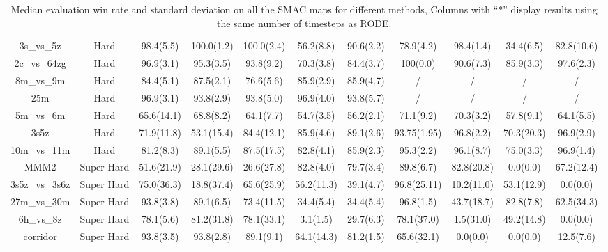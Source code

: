 \begin{table}
\begin{tabular}{ccccccccccc}
        3s\_vs\_5z &           Hard &   98.4(5.5) &  100.0(1.2) & 100.0(2.4) &  56.2(8.8) &  90.6(2.2) &   78.9(4.2) &  98.4(1.4) &  34.4(6.5) & 82.8(10.6) \\
      2c\_vs\_64zg &           Hard &   96.9(3.1) &   95.3(3.5) &  93.8(9.2) &  70.3(3.8) &  84.4(3.7) &    100(0.0) &  90.6(7.3) &  85.9(3.3) &  97.6(2.3) \\
        8m\_vs\_9m &           Hard &   84.4(5.1) &   87.5(2.1) &  76.6(5.6) &  85.9(2.9) &  85.9(4.7) &           / &          / &          / &          / \\
             25m &           Hard &   96.9(3.1) &   93.8(2.9) &  93.8(5.0) &  96.9(4.0) &  93.8(5.7) &           / &          / &          / &          / \\
        5m\_vs\_6m &           Hard &  65.6(14.1) &   68.8(8.2) &  64.1(7.7) &  54.7(3.5) &  56.2(2.1) &   71.1(9.2) &  70.3(3.2) &  57.8(9.1) &  64.1(5.5) \\
            3s5z &           Hard &  71.9(11.8) &  53.1(15.4) & 84.4(12.1) &  85.9(4.6) &  89.1(2.6) & 93.75(1.95) &  96.8(2.2) & 70.3(20.3) &  96.9(2.9) \\
      10m\_vs\_11m &           Hard &   81.2(8.3) &   89.1(5.5) & 87.5(17.5) &  82.8(4.1) &  85.9(2.3) &   95.3(2.2) &  96.1(8.7) &  75.0(3.3) &  96.9(1.4) \\
            MMM2 &     Super Hard &  51.6(21.9) &  28.1(29.6) & 26.6(27.8) &  82.8(4.0) &  79.7(3.4) &   89.8(6.7) & 82.8(20.8) &   0.0(0.0) & 67.2(12.4) \\
    3s5z\_vs\_3s6z &     Super Hard &  75.0(36.3) &  18.8(37.4) & 65.6(25.9) & 56.2(11.3) &  39.1(4.7) & 96.8(25.11) & 10.2(11.0) & 53.1(12.9) &   0.0(0.0) \\
      27m\_vs\_30m &     Super Hard &   93.8(3.8) &   89.1(6.5) & 73.4(11.5) &  34.4(5.4) &  34.4(5.4) &   96.8(1.5) & 43.7(18.7) &  82.8(7.8) & 62.5(34.3) \\
        6h\_vs\_8z &     Super Hard &   78.1(5.6) &  81.2(31.8) & 78.1(33.1) &   3.1(1.5) &  29.7(6.3) &  78.1(37.0) &  1.5(31.0) & 49.2(14.8) &   0.0(0.0) \\
        corridor &     Super Hard &   93.8(3.5) &   93.8(2.8) &  89.1(9.1) & 64.1(14.3) &  81.2(1.5) &  65.6(32.1) &   0.0(0.0) &   0.0(0.0) &  12.5(7.6) \\
\bottomrule
\end{tabular}
\centering
\caption{Median evaluation win rate and standard deviation on all the SMAC maps for different methods, Columns with ``*'' display results using the same number of timesteps as RODE. %
} 
\label{tab:app-SMAC-results-cut}
\vspace{-4mm}
\end{table}

